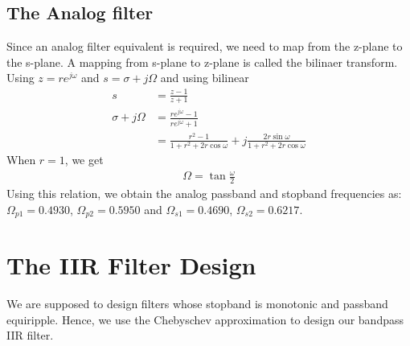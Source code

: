 \documentclass{article}
\begin{document}
\subsection{The Analog filter}
Since an analog filter equivalent is required, we need to map from the z-plane to the s-plane. A mapping from s-plane to z-plane is called the bilinaer transform.
Using $z = re^{j\omega}$ and $s = \sigma + j\Omega$ and using bilinear 
\begin{align}
    s &= \frac{z-1}{z+1}\\
    \sigma + j\Omega &= \frac{re^{j\omega} -1}{re^{j\omega} + 1}\\
    &= \frac{r^2-1}{1+r^2+2r\cos{\omega}} + j \frac{2r\sin{\omega}}{1+r^2+2r\cos{\omega}}
\end{align}
When $r = 1$, we get
\begin{align}
  \Omega = \tan \frac{\omega}{2}  
\end{align}
Using this relation, we obtain the analog passband and stopband frequencies as:
$\Omega_{p1} = 0.4930$, $\Omega_{p2} = 0.5950$ and $\Omega_{s1} = 0.4690$, $\Omega_{s2} = 0.6217$.

\section{The IIR Filter Design}
We are supposed to design filters whose stopband is monotonic and passband equiripple.  
Hence, we use the Chebyschev approximation to design our bandpass IIR filter.
\end{document}
